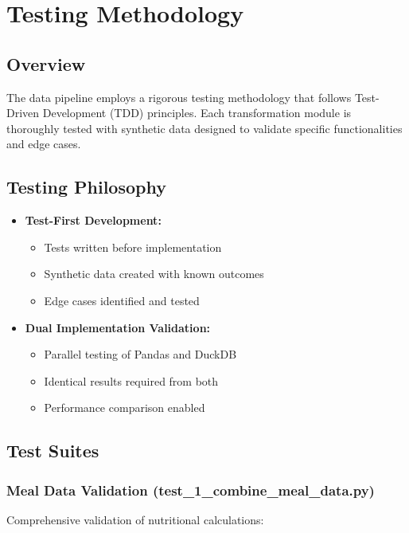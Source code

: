 \section{Testing Methodology}

\subsection{Overview}
The data pipeline employs a rigorous testing methodology that follows Test-Driven Development (TDD) principles. Each transformation module is thoroughly tested with synthetic data designed to validate specific functionalities and edge cases.

\subsection{Testing Philosophy}
\begin{itemize}
    \item \textbf{Test-First Development:}
    \begin{itemize}
        \item Tests written before implementation
        \item Synthetic data created with known outcomes
        \item Edge cases identified and tested
    \end{itemize}
    
    \item \textbf{Dual Implementation Validation:}
    \begin{itemize}
        \item Parallel testing of Pandas and DuckDB
        \item Identical results required from both
        \item Performance comparison enabled
    \end{itemize}
\end{itemize}

\subsection{Test Suites}

\subsubsection{Meal Data Validation (test\_1\_combine\_meal\_data.py)}
Comprehensive validation of nutritional calculations:

